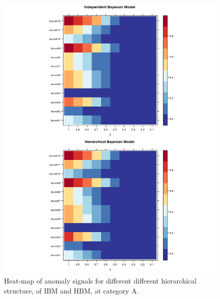 		\newpage
		
		\begin{figure}[!h]
			\centering
			\includegraphics[width=1\linewidth]{../../R-codes/JAGS/plots/sim2/heatA}
			\caption{Heat-map of anomaly signals for different different hierarchical structure, of IBM and HBM, at category A.}
			\label{fig:heatA3}
		\end{figure}
		
		\newpage
		

